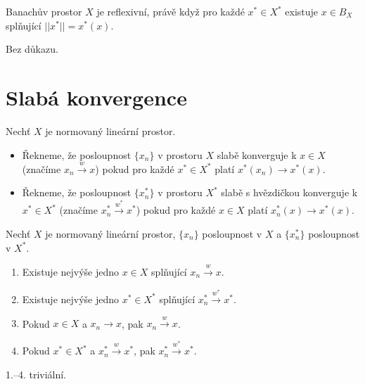 \documentclass[12pt]{article}					%
\begin{document}
\begin{veta}
	Banachův prostor $X$ je reflexivní, právě když pro každé $x^* \in X^*$ existuje $x \in B_X$ splňující $||x^*|| = x^*(x)$.

	\begin{dukazin}
		Bez důkazu.
	\end{dukazin}
\end{veta}


\section{Slabá konvergence}
\begin{definice}
	Nechť $X$ je normovaný lineární prostor.

	\begin{itemize}
		\item Řekneme, že posloupnost $\{x_n\}$ v prostoru $X$ slabě konverguje k $x \in X$ (značíme $x_n \overset{w}{\rightarrow} x$) pokud pro každé $x^* \in X^*$ platí $x^*(x_n) \rightarrow x^*(x)$.
		\item Řekneme, že posloupnost $\{x_n^*\}$ v prostoru $X^*$ slabě s hvězdičkou konverguje k $x^* \in X^*$ (značíme $x_n^* \overset{w^*}{\rightarrow} x^*$) pokud pro každé $x \in X$ platí $x_n^*(x) \rightarrow x^*(x)$.
	\end{itemize}
\end{definice}

\begin{lemma}
	Nechť $X$ je normovaný lineární prostor, $\{x_n\}$ posloupnost v $X$ a $\{x_n^*\}$ posloupnost v $X^*$.

	\begin{enumerate}
		\item Existuje nejvýše jedno $x \in X$ splňující $x_n \overset{w}{\rightarrow} x$.
		\item Existuje nejvýše jedno $x^* \in X^*$ splňující $x_n^* \overset{w^*}{\rightarrow} x^*$.
		\item Pokud $x \in X$ a $x_n \rightarrow x$, pak $x_n \overset{w}{\rightarrow} x$.
		\item Pokud $x^* \in X^*$ a $x_n^* \overset{w}{\rightarrow} x^*$, pak $x_n^* \overset{w^*}{\rightarrow} x^*$.
	\end{enumerate}

	\begin{dukazin}
		1.–4. triviální.
	\end{dukazin}
\end{lemma}
\end{document}
